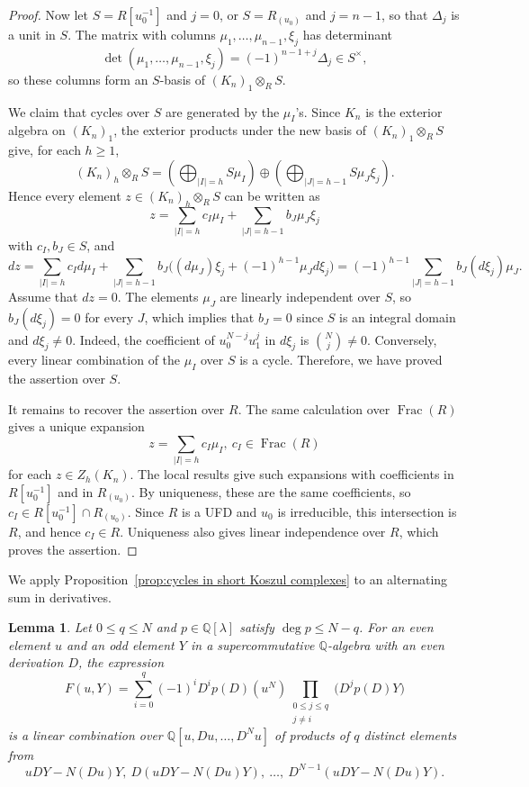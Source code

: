 \documentclass[reqno]{amsart}
\newtheorem{lem}[thm]{Lemma}
\theoremstyle{definition}
\theoremstyle{remark}
\newcommand{\QQ}{\mathbb{Q}}
\DeclareMathOperator{\degg}{deg}
\begin{document}
\begin{proof}
Now let $S=R[u_0^{-1}]$ and $j=0$, or $S=R_{(u_0)}$ and $j=n-1$, so that $\Delta_j$ is a unit in $S$. The matrix with columns $\mu_1,\dots,\mu_{n-1},\xi_j$ has determinant \[\det(\mu_1,\dots,\mu_{n-1},\xi_j)=(-1)^{n-1+j}\Delta_j\in S^\times,\] so these columns form an $S$-basis of $(K_n)_1\otimes_RS$.

We claim that cycles over $S$ are generated by the $\mu_I$'s. Since $K_n$ is the exterior algebra on $(K_n)_1$, the exterior products under the new basis of $(K_n)_1\otimes_RS$ give, for each $h\ge1$, \[(K_n)_h\otimes_RS=\left(\bigoplus_{|I|=h}S\mu_I\right)\oplus\left(\bigoplus_{|J|=h-1}S\mu_J\xi_j\right).\] Hence every element $z\in(K_n)_h\otimes_RS$ can be written as \[z=\sum_{|I|=h}c_I\mu_I+\sum_{|J|=h-1}b_J\mu_J\xi_j\] with $c_I,b_J\in S$, and \[dz=\sum_{|I|=h}c_I d\mu_I+\sum_{|J|=h-1}b_J\bigl((d\mu_J)\xi_j+(-1)^{h-1}\mu_Jd\xi_j\bigr)=(-1)^{h-1}\sum_{|J|=h-1}b_J(d\xi_j)\mu_J.\] Assume that $dz=0$. The elements $\mu_J$ are linearly independent over $S$, so $b_J(d\xi_j)=0$ for every $J$, which implies that $b_J=0$ since $S$ is an integral domain and $d\xi_j\ne0$. Indeed, the coefficient of $u_0^{N-j}u_1^j$ in $d\xi_j$ is $\binom{N}{j}\ne0$. Conversely, every linear combination of the $\mu_I$ over $S$ is a cycle. Therefore, we have proved the assertion over $S$.

It remains to recover the assertion over $R$. The same calculation over $\operatorname{Frac}(R)$ gives a unique expansion \[z=\sum_{|I|=h}c_I\mu_I,\ c_I\in\operatorname{Frac}(R)\] for each $z\in Z_h(K_n)$. The local results give such expansions with coefficients in $R[u_0^{-1}]$ and in $R_{(u_0)}$. By uniqueness, these are the same coefficients, so $c_I\in R[u_0^{-1}]\cap R_{(u_0)}$. Since $R$ is a UFD and $u_0$ is irreducible, this intersection is $R$, and hence $c_I\in R$. Uniqueness also gives linear independence over $R$, which proves the assertion.
\end{proof}

We apply Proposition~\ref{prop:cycles in short Koszul complexes} to an alternating sum in derivatives.

\begin{lem}\label{lem:polynomiality of the alternating sum}
Let $0\le q\le N$ and $p\in\QQ[\lambda]$ satisfy $\degg p\le N-q$. For an even element $u$ and an odd element $Y$ in a supercommutative $\QQ$-algebra with an even derivation $D$, the expression
\[F(u,Y)=\sum_{i=0}^q(-1)^iD^ip(D)(u^N)\prod_{\substack{0\le j\le q\\j\ne i}}\bigl(D^jp(D)Y\bigr)\]
is a linear combination over $\QQ[u,Du,\dots,D^Nu]$ of products of $q$ distinct elements from
\[uDY-N(Du)Y,\ D(uDY-N(Du)Y),\ \dots,\ D^{N-1}(uDY-N(Du)Y).\]
\end{lem}
\end{document}
